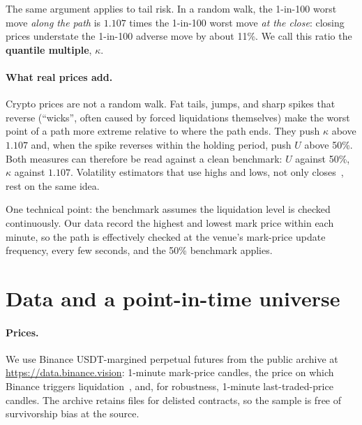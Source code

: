 The same argument applies to tail risk. In a random walk, the 1-in-100 worst move \emph{along the
path} is $1.107$ times the 1-in-100 worst move \emph{at the close}: closing prices understate the
1-in-100 adverse move by about 11\%. We call this ratio the \textbf{quantile multiple}, $\kappa$.

\paragraph{What real prices add.} Crypto prices are not a random walk. Fat tails, jumps, and sharp
spikes that reverse (``wicks'', often caused by forced liquidations themselves) make the worst point
of a path more extreme relative to where the path ends. They push $\kappa$ above $1.107$ and, when the
spike reverses within the holding period, push $U$ above 50\%. Both measures can therefore be read
against a clean benchmark: $U$ against 50\%, $\kappa$ against $1.107$. Volatility estimators that use
highs and lows, not only closes~\cite{parkinson,garmanklass,rogerssatchell}, rest on the same idea.

One technical point: the benchmark assumes the liquidation level is checked continuously. Our data
record the highest and lowest mark price within each minute, so the path is effectively checked at
the venue's mark-price update frequency, every few seconds, and the 50\% benchmark applies.
\fi

\section{Data and a point-in-time universe}
\label{sec:data}

\paragraph{Prices.} We use Binance USDT-margined perpetual futures from the public archive at
\url{https://data.binance.vision}: 1-minute mark-price candles, the price on which Binance triggers
liquidation~\cite{binance-liq}, and, for robustness, 1-minute last-traded-price candles. The archive
retains files for delisted contracts, so the sample is free of survivorship bias at the source.

